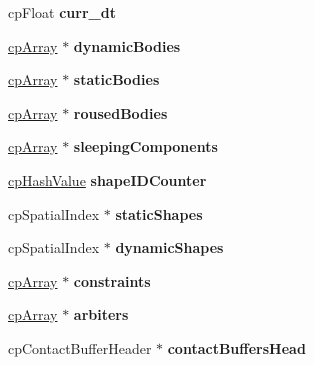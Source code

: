 \begin{DoxyCompactItemize}
\mbox{\label{structcpSpace_a7a0376a802c259022bf36c81d26ab356}} 
cp\+Float {\bfseries curr\+\_\+dt}
\item 
\mbox{\label{structcpSpace_a3c1f7035e449f9ef682f72d92215b5d7}} 
\hyperlink{structcpArray}{cp\+Array} $\ast$ {\bfseries dynamic\+Bodies}
\item 
\mbox{\label{structcpSpace_ab5d6865639dd020316348d4688bc65bb}} 
\hyperlink{structcpArray}{cp\+Array} $\ast$ {\bfseries static\+Bodies}
\item 
\mbox{\label{structcpSpace_a0b73e2b5a674694576a69001fa044f0e}} 
\hyperlink{structcpArray}{cp\+Array} $\ast$ {\bfseries roused\+Bodies}
\item 
\mbox{\label{structcpSpace_ab1d7e142c3903e92127055d475a769f8}} 
\hyperlink{structcpArray}{cp\+Array} $\ast$ {\bfseries sleeping\+Components}
\item 
\mbox{\label{structcpSpace_a362a2cc9d39192b4a03f6e85f80f2a06}} 
\hyperlink{group__basicTypes_gae7eb4775a9f43914a15553ca65a048f4}{cp\+Hash\+Value} {\bfseries shape\+I\+D\+Counter}
\item 
\mbox{\label{structcpSpace_a96ba64a6cbebffb3d7f239380fbe90e4}} 
cp\+Spatial\+Index $\ast$ {\bfseries static\+Shapes}
\item 
\mbox{\label{structcpSpace_a4b6f34d106ace46b44b2e86214e47a12}} 
cp\+Spatial\+Index $\ast$ {\bfseries dynamic\+Shapes}
\item 
\mbox{\label{structcpSpace_a4cedf5b18e7e384a048a7df812c11499}} 
\hyperlink{structcpArray}{cp\+Array} $\ast$ {\bfseries constraints}
\item 
\mbox{\label{structcpSpace_a9ddfb30710fdf21bfc89e98c6634a7d6}} 
\hyperlink{structcpArray}{cp\+Array} $\ast$ {\bfseries arbiters}
\item 
\mbox{\label{structcpSpace_a5a799b9b0a4a322ab5a22795c2d22473}} 
cp\+Contact\+Buffer\+Header $\ast$ {\bfseries contact\+Buffers\+Head}
\item 

\end{DoxyCompactItemize}
